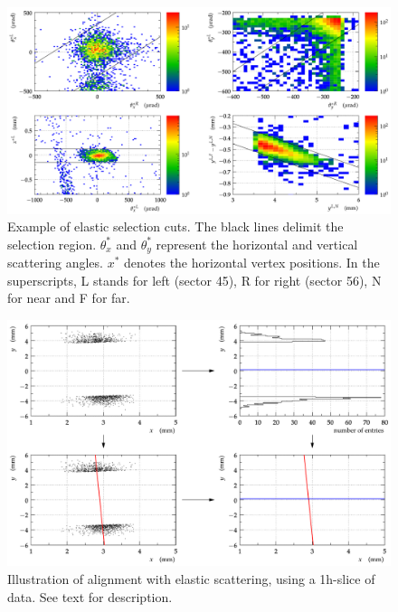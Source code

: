 \documentclass[TOTEM]{cern/cernphprep}
\begin{document}
\begin{figure}[h!]
\begin{center}
\includegraphics[width=1\hsize]{fig/calibration_fill/el_cut_example.pdf}
\caption{%
Example of elastic selection cuts. The black lines delimit the selection region. $\theta_x^*$ and $\theta_y^*$ represent the horizontal and vertical scattering angles. $x^*$ denotes the horizontal vertex positions. In the superscripts, L stands for left (sector 45), R for right (sector 56), N for near and F for far.
}
\label{fig:el_cuts}
\end{center}
\end{figure}

\begin{figure}[h!]
\begin{center}
\includegraphics[width=1\hsize]{fig/calibration_fill/el_alignment_method.pdf}
\caption{%
Illustration of alignment with elastic scattering, using a 1h-slice of data. See text for description.
}
\label{fig:el_alignment_method}
\end{center}
\end{figure}
\end{document}
